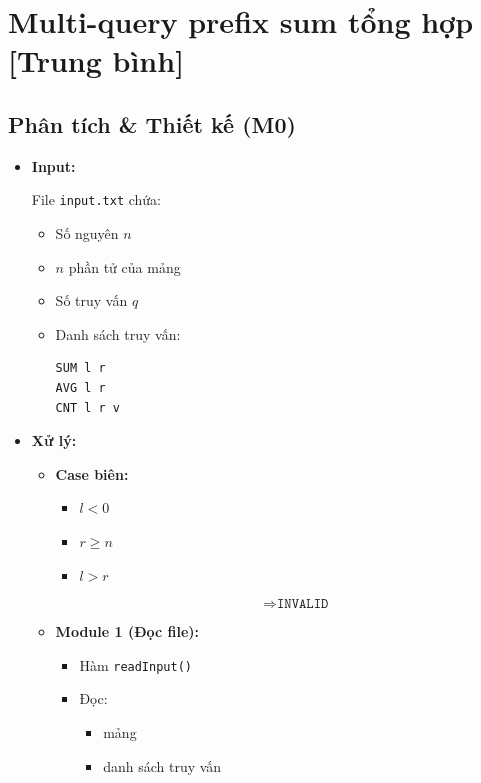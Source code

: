\section{Multi-query prefix sum tổng hợp [Trung bình]}
\subsection{Phân tích \& Thiết kế (M0)}

\begin{itemize}

    \item \textbf{Input:}

    File \texttt{input.txt} chứa:

    \begin{itemize}
        \item Số nguyên \(n\)
        \item \(n\) phần tử của mảng
        \item Số truy vấn \(q\)
        \item Danh sách truy vấn:
\begin{lstlisting}
SUM l r
AVG l r
CNT l r v
\end{lstlisting}
    \end{itemize}

    \item \textbf{Xử lý:}

    \begin{itemize}

        \item \textbf{Case biên:}

        \begin{itemize}
            \item \(l < 0\)
            \item \(r \ge n\)
            \item \(l > r\)

            \[
                \Rightarrow \texttt{INVALID}
            \]
        \end{itemize}

        \item \textbf{Module 1 (Đọc file):}

        \begin{itemize}
            \item Hàm \texttt{readInput()}
            \item Đọc:
            \begin{itemize}
                \item mảng
                \item danh sách truy vấn
            \end{itemize}
        \end{itemize}


\end{itemize}
\end{itemize}
